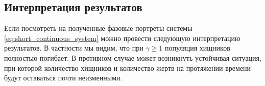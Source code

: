 \subsection{Интерпретация результатов}

Если посмотреть на полученные фазовые портреты системы \ref{eq:short_continuous_system} можно провести следующую интерпретацию результатов. В частности мы видим, что при $\gamma \geqslant 1$ популяция хищников полностью погибает. В противном случае может возникнуть устойчивая ситуация, при которой количество хищников и количество жертв на протяжении времени будут оставаться почти неизменными.